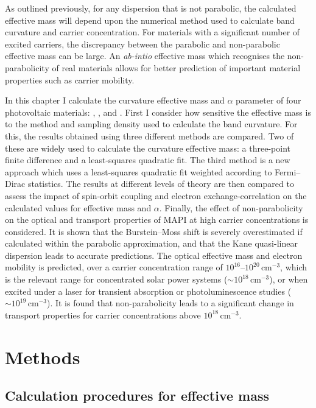 As outlined previously, for any dispersion that is not parabolic, the calculated effective mass will depend upon the numerical method used to calculate band curvature and carrier concentration.
For materials with a significant number of excited carriers, the discrepancy between the parabolic and non-parabolic effective mass can be large.\autocite{Ruf1990,Riffe2002}
An \textit{ab-intio} effective mass which recognises the non-parabolicity of real materials allows for better prediction of important material properties such as carrier mobility. 

In this chapter I calculate the curvature effective mass and $\alpha$ parameter of four photovoltaic materials: , ,  and . 
First I consider how sensitive the effective mass is to the method and sampling density used to calculate the band curvature. 
For this, the results obtained using three different methods are compared. 
Two of these are widely used to calculate the curvature effective mass: a three-point finite difference and a least-squares quadratic fit. 
The third method is a new approach which uses a least-squares quadratic fit weighted according to Fermi--Dirac statistics. 
The results at different levels of theory are then compared to assess the impact of spin-orbit coupling and electron exchange-correlation on the calculated values for effective mass and $\alpha$. 
Finally, the effect of non-parabolicity on the optical and transport properties of MAPI at high carrier concentrations is considered. 
It is shown that the Burstein--Moss shift is severely overestimated if calculated within the parabolic approximation, and that the Kane quasi-linear dispersion leads to accurate predictions.
The optical effective mass and electron mobility is predicted, over a carrier concentration range of $10^{16}$--$10^{20}\,\mathrm{cm}^{-3}$, which is the relevant range for concentrated solar power systems ($\sim10^{18}\,\mathrm{cm}^{-3}$)\autocite{Law2014}, or when excited under a laser for transient absorption or photoluminescence studies ($\sim10^{19}\,\mathrm{cm}^{-3}$).
It is found that non-parabolicity leads to a significant change in transport properties for carrier concentrations above $10^{18}\,\mathrm{cm}^{-3}$.


\section{Methods} \label{ch4:methods}

\subsection{Calculation procedures for effective mass}


